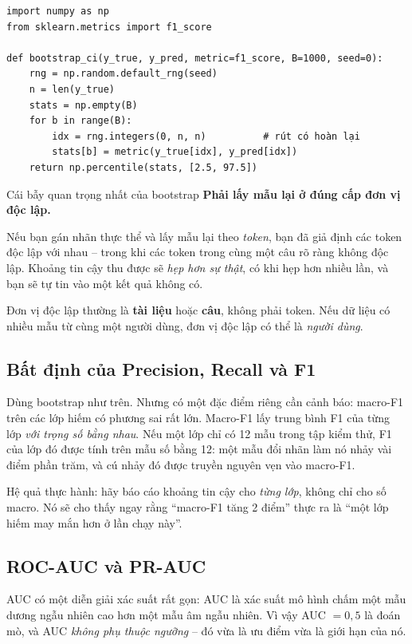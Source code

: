 \begin{verbatim}
import numpy as np
from sklearn.metrics import f1_score

def bootstrap_ci(y_true, y_pred, metric=f1_score, B=1000, seed=0):
    rng = np.random.default_rng(seed)
    n = len(y_true)
    stats = np.empty(B)
    for b in range(B):
        idx = rng.integers(0, n, n)          # rút có hoàn lại
        stats[b] = metric(y_true[idx], y_pred[idx])
    return np.percentile(stats, [2.5, 97.5])
\end{verbatim}

\begin{pitfall}{Cái bẫy quan trọng nhất của bootstrap}
\textbf{Phải lấy mẫu lại ở đúng cấp đơn vị độc lập.}

Nếu bạn gán nhãn thực thể và lấy mẫu lại theo \emph{token}, bạn đã giả định các token độc lập với nhau -- trong khi các token trong cùng một câu rõ ràng không độc lập. Khoảng tin cậy thu được sẽ \emph{hẹp hơn sự thật}, có khi hẹp hơn nhiều lần, và bạn sẽ tự tin vào một kết quả không có.

Đơn vị độc lập thường là \textbf{tài liệu} hoặc \textbf{câu}, không phải token. Nếu dữ liệu có nhiều mẫu từ cùng một người dùng, đơn vị độc lập có thể là \emph{người dùng}.
\end{pitfall}

\subsection{Bất định của Precision, Recall và F1}
\label{ssec:prf_uncertainty}

Dùng bootstrap như trên. Nhưng có một đặc điểm riêng cần cảnh báo: macro-F1 trên các lớp hiếm có phương sai rất lớn. Macro-F1 lấy trung bình F1 của từng lớp \emph{với trọng số bằng nhau}. Nếu một lớp chỉ có 12 mẫu trong tập kiểm thử, F1 của lớp đó được tính trên mẫu số bằng 12: một mẫu đổi nhãn làm nó nhảy vài điểm phần trăm, và cú nhảy đó được truyền nguyên vẹn vào macro-F1.

Hệ quả thực hành: hãy báo cáo khoảng tin cậy cho \emph{từng lớp}, không chỉ cho số macro. Nó sẽ cho thấy ngay rằng “macro-F1 tăng 2 điểm” thực ra là “một lớp hiếm may mắn hơn ở lần chạy này”.

\subsection{ROC-AUC và PR-AUC}
\label{ssec:auc}

AUC có một diễn giải xác suất rất gọn: AUC là xác suất mô hình chấm một mẫu dương ngẫu nhiên cao hơn một mẫu âm ngẫu nhiên. Vì vậy AUC $= 0{,}5$ là đoán mò, và AUC \emph{không phụ thuộc ngưỡng} -- đó vừa là ưu điểm vừa là giới hạn của nó.

